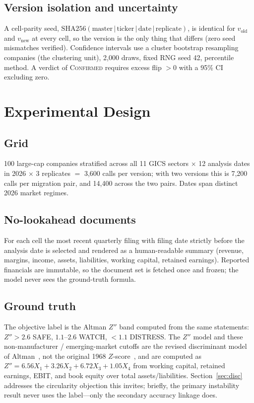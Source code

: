 \documentclass[10pt,twocolumn]{article}
\begin{document}
\subsection{Version isolation and uncertainty}
A cell-parity seed, $\mathrm{SHA256}(\text{master}\,|\,\text{ticker}\,|\,\text{date}\,|\,\text{replicate})$, is identical for $v_{\mathrm{old}}$ and $v_{\mathrm{new}}$ at every cell, so the version is the only thing that differs (zero seed mismatches verified). Confidence intervals use a cluster bootstrap resampling companies (the clustering unit), 2{,}000 draws, fixed RNG seed 42, percentile method. A verdict of \textsc{Confirmed} requires excess flip $>0$ with a 95\% CI excluding zero.

\section{Experimental Design}
\subsection{Grid}
100 large-cap companies stratified across all 11 GICS sectors $\times$ 12 analysis dates in 2026 $\times$ 3 replicates $=$ 3{,}600 calls per version; with two versions this is 7{,}200 calls per migration pair, and 14{,}400 across the two pairs. Dates span distinct 2026 market regimes.

\subsection{No-lookahead documents}
For each cell the most recent quarterly filing with filing date strictly before the analysis date is selected and rendered as a human-readable summary (revenue, margins, income, assets, liabilities, working capital, retained earnings). Reported financials are immutable, so the document set is fetched once and frozen; the model never sees the ground-truth formula.

\subsection{Ground truth}
The objective label is the Altman $Z''$ band computed from the same statements: $Z''>2.6$ SAFE, $1.1$--$2.6$ WATCH, $<1.1$ DISTRESS. The $Z''$ model and these non-manufacturer / emerging-market cutoffs are the revised discriminant model of Altman~\cite{altman_em}, not the original 1968 $Z$-score~\cite{altman}, and are computed as $Z''=6.56X_1+3.26X_2+6.72X_3+1.05X_4$ from working capital, retained earnings, EBIT, and book equity over total assets/liabilities. Section~\ref{sec:disc} addresses the circularity objection this invites; briefly, the primary instability result never uses the label---only the secondary accuracy linkage does.
\end{document}
